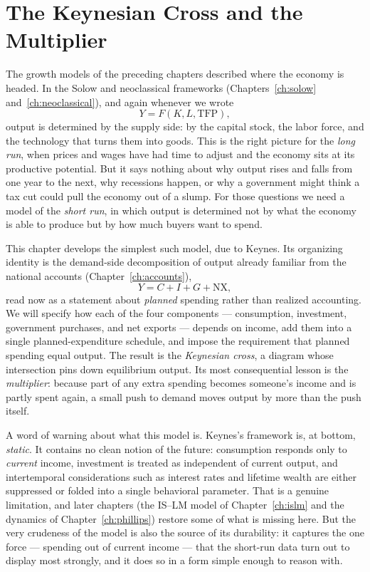 \chapter{The Keynesian Cross and the Multiplier}
\label{ch:keynes}

The growth models of the preceding chapters described where the economy is headed. In the Solow and neoclassical frameworks (Chapters~\ref{ch:solow} and~\ref{ch:neoclassical}), and again whenever we wrote
\[
Y = F(K, L, \mathrm{TFP}),
\]
output is determined by the supply side: by the capital stock, the labor force, and the technology that turns them into goods. This is the right picture for the \emph{long run}, when prices and wages have had time to adjust and the economy sits at its productive potential. But it says nothing about why output rises and falls from one year to the next, why recessions happen, or why a government might think a tax cut could pull the economy out of a slump. For those questions we need a model of the \emph{short run}, in which output is determined not by what the economy is able to produce but by how much buyers want to spend.

This chapter develops the simplest such model, due to Keynes. Its organizing identity is the demand-side decomposition of output already familiar from the national accounts (Chapter~\ref{ch:accounts}),
\[
Y = C + I + G + \mathrm{NX},
\]
read now as a statement about \emph{planned} spending rather than realized accounting. We will specify how each of the four components --- consumption, investment, government purchases, and net exports --- depends on income, add them into a single planned-expenditure schedule, and impose the requirement that planned spending equal output. The result is the \emph{Keynesian cross}, a diagram whose intersection pins down equilibrium output. Its most consequential lesson is the \emph{multiplier}: because part of any extra spending becomes someone's income and is partly spent again, a small push to demand moves output by more than the push itself.

A word of warning about what this model is. Keynes's framework is, at bottom, \emph{static}. It contains no clean notion of the future: consumption responds only to \emph{current} income, investment is treated as independent of current output, and intertemporal considerations such as interest rates and lifetime wealth are either suppressed or folded into a single behavioral parameter. That is a genuine limitation, and later chapters (the IS--LM model of Chapter~\ref{ch:islm} and the dynamics of Chapter~\ref{ch:phillips}) restore some of what is missing here. But the very crudeness of the model is also the source of its durability: it captures the one force --- spending out of current income --- that the short-run data turn out to display most strongly, and it does so in a form simple enough to reason with.

